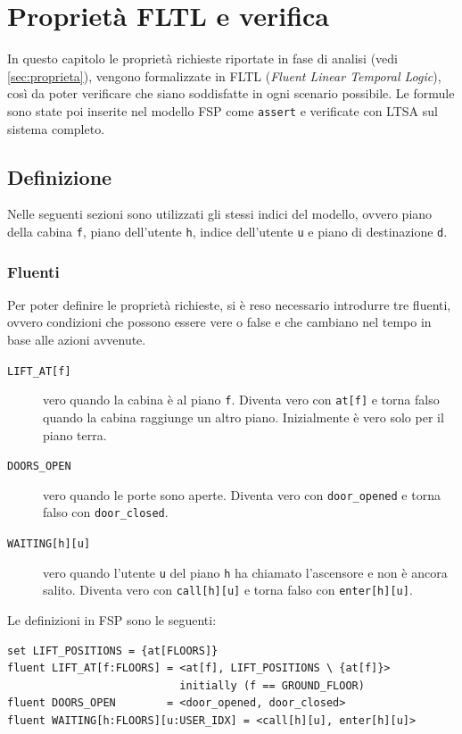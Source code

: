 \chapter{Proprietà FLTL e verifica}
In questo capitolo le proprietà richieste riportate in fase di analisi (vedi \cref{sec:proprieta}), vengono formalizzate in FLTL (\emph{Fluent Linear Temporal Logic}), così da poter verificare che siano soddisfatte in ogni scenario possibile.
Le formule sono state poi inserite nel modello FSP come \texttt{assert} e verificate con LTSA sul sistema completo.

%
%
\section{Definizione}
Nelle seguenti sezioni sono utilizzati gli stessi indici del modello, ovvero piano della cabina \texttt{f}, piano dell'utente \texttt{h}, indice dell'utente \texttt{u} e piano di destinazione \texttt{d}.

\subsection{Fluenti}
Per poter definire le proprietà richieste, si è reso necessario introdurre tre fluenti, ovvero condizioni che possono essere vere o false e che cambiano nel tempo in base alle azioni avvenute.

\begin{description}
  \item[\texttt{LIFT\_AT[f]}] vero quando la cabina è al piano \texttt{f}. Diventa vero con \texttt{at[f]} e torna falso quando la cabina raggiunge un altro piano. Inizialmente è vero solo per il piano terra.
  \item[\texttt{DOORS\_OPEN}] vero quando le porte sono aperte. Diventa vero con \texttt{door\_opened} e torna falso con \texttt{door\_closed}.
  \item[\texttt{WAITING[h][u]}] vero quando l'utente \texttt{u} del piano \texttt{h} ha chiamato l'ascensore e non è ancora salito. Diventa vero con \texttt{call[h][u]} e torna falso con \texttt{enter[h][u]}.
\end{description}

Le definizioni in FSP sono le seguenti:
\begin{lstlisting}[basicstyle=\ttfamily\small]
set LIFT_POSITIONS = {at[FLOORS]}
fluent LIFT_AT[f:FLOORS] = <at[f], LIFT_POSITIONS \ {at[f]}>
                           initially (f == GROUND_FLOOR)
fluent DOORS_OPEN        = <door_opened, door_closed>
fluent WAITING[h:FLOORS][u:USER_IDX] = <call[h][u], enter[h][u]>
\end{lstlisting}

